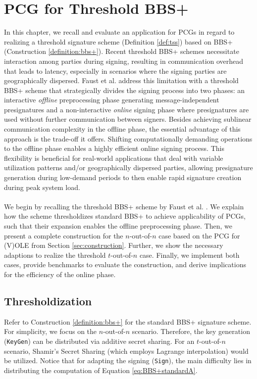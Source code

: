 \chapter{PCG for Threshold BBS+}
\label{chapter:PCGforBBSPlus}
In this chapter, we recall and evaluate an application for PCGs in regard to realizing a threshold signature scheme (Definition \ref{def:tss}) based on BBS+ (Construction \ref{definition:bbs+}). Recent threshold BBS+ schemes \cite{gennaro2019fully, doerner2023threshold} necessitate interaction among parties during signing, resulting in communication overhead that leads to latency, especially in scenarios where the signing parties are geographically dispersed. Faust et al. \cite{cryptoeprint:2023/1076} address this limitation with a threshold BBS+ scheme that strategically divides the signing process into two phases: an interactive \textit{offline} preprocessing phase generating message-independent presignatures and a non-interactive \textit{online} signing phase where presignatures are used without further communication between signers. Besides achieving sublinear communication complexity in the offline phase, the essential advantage of this approach is the trade-off it offers. Shifting computationally demanding operations to the offline phase enables a highly efficient online signing process. This flexibility is beneficial for real-world applications that deal with variable utilization patterns and/or geographically dispersed parties, allowing presignature generation during low-demand periods to then enable rapid signature creation during peak system load. 
\\\\
We begin by recalling the threshold BBS+ scheme by Faust et al. \cite{cryptoeprint:2023/1076}. We explain how the scheme thresholdizes standard BBS+ to achieve applicability of PCGs, such that their expansion enables the offline preprocessing phase. Then, we present a complete construction for the $n$-out-of-$n$ case based on the PCG for (V)OLE from Section \ref{sec:construction}. Further, we show the necessary adaptions to realize the threshold $t$-out-of-$n$ case. Finally, we implement both cases, provide benchmarks to evaluate the construction, and derive implications for the efficiency of the online phase. 

\section{Thresholdization}
Refer to Construction \ref{definition:bbs+} for the standard BBS+ signature scheme. For simplicity, we focus on the $n$-out-of-$n$ scenario. Therefore, the key generation (\texttt{\textup{KeyGen}}) can be distributed via additive secret sharing. For an $t$-out-of-$n$ scenario, Shamir's Secret Sharing  \cite{shamir1979share} (which employs Lagrange interpolation) would be utilized. Notice that for adapting the signing (\texttt{\textup{Sign}}), the main difficulty lies in distributing the computation of Equation \ref{eq:BBS+standardA}.

